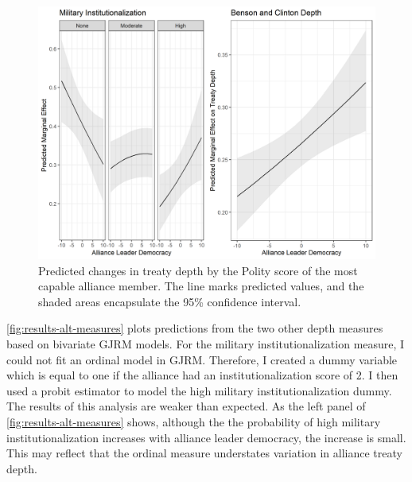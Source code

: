 \documentclass[12pt]{article}
\begin{document}
\begin{figure}
\includegraphics[width=.95\textwidth]{results-alt-measures-sep.png}  
\caption{Predicted changes in treaty depth by the Polity score of the most capable alliance member. The line marks predicted values, and the shaded areas encapsulate the 95\% confidence interval.}
\label{fig:results-alt-measures-sep}
\end{figure}


\autoref{fig:results-alt-measures} plots predictions from the two other depth measures based on bivariate GJRM models. 
For the military institutionalization measure, I could not fit an ordinal model in GJRM. 
Therefore, I created a dummy variable which is equal to one if the alliance had an institutionalization score of 2. 
I then used a probit estimator to model the high military institutionalization dummy. 
The results of this analysis are weaker than expected. 
As the left panel of \autoref{fig:results-alt-measures} shows, although the the probability of high military institutionalization increases with alliance leader democracy, the increase is small. 
This may reflect that the ordinal measure understates variation in alliance treaty depth. 
\end{document}
